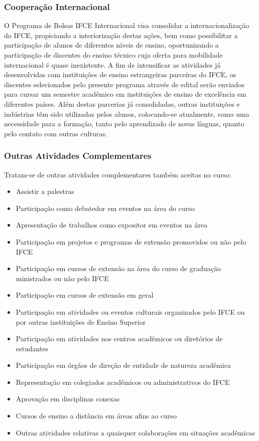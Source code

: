 \documentclass{paper}
\begin{document}
\subsubsection{Cooperação Internacional}

O Programa de Bolsas IFCE Internacional visa consolidar a internacionalização do IFCE, propiciando a interiorização destas ações, bem como possibilitar a participação de alunos de diferentes níveis de ensino, oportunizando a participação de discentes do ensino técnico cuja oferta para mobilidade internacional é quase inexistente.
A fim de intensificar as atividades já desenvolvidas com instituições de ensino estrangeiras parceiras do IFCE, os discentes selecionados pelo presente programa através de edital serão enviados para cursar um semestre acadêmico em instituições de ensino de excelência em diferentes países.
Além destas parcerias já consolidadas, outras instituições e indústrias têm sido utilizadas pelos alunos, colocando-se atualmente, como uma necessidade para a formação, tanto pelo aprendizado de novas línguas, quanto pelo contato com outras culturas.

\subsubsection{Outras Atividades Complementares}
Tratam-se de outras atividades complementares também aceitas no curso:
\begin{itemize}
    \item Assistir a palestras
    \item Participação como debatedor em eventos na área do curso
    \item Apresentação de trabalhos como expositor em eventos na área
    \item Participação em projetos e programas de extensão promovidos ou não pelo IFCE
    \item Participação em cursos de extensão na área do curso de graduação ministrados ou não pelo IFCE
    \item Participação em cursos de extensão em geral
    \item Participação em atividades ou eventos culturais organizados pelo IFCE ou por outras instituições de Ensino Superior
    \item Participação em atividades nos centros acadêmicos ou diretórios de estudantes
    \item Participação em órgãos de direção de entidade de natureza acadêmica
    \item Representação em colegiados acadêmicos ou administrativos do IFCE
    \item Aprovação em disciplinas conexas
    \item Cursos de ensino a distância em áreas afins ao curso
    \item Outras atividades relativas a quaisquer colaborações em situações acadêmicas
\end{itemize}
\end{document}

